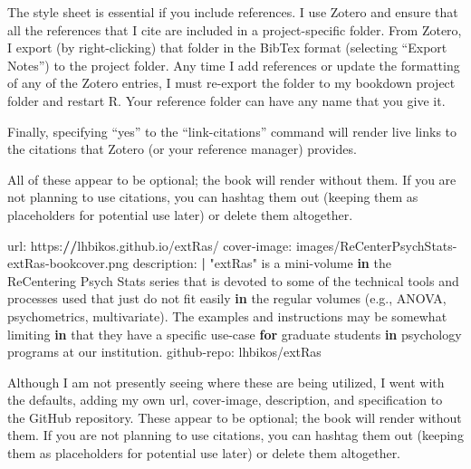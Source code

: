\documentclass[
]{book}
\newenvironment{Shaded}{\begin{snugshade}}{\end{snugshade}}
\newcommand{\ControlFlowTok}[1]{\textcolor[rgb]{0.13,0.29,0.53}{\textbf{#1}}}
\newcommand{\ErrorTok}[1]{\textcolor[rgb]{0.64,0.00,0.00}{\textbf{#1}}}
\newcommand{\FunctionTok}[1]{\textcolor[rgb]{0.00,0.00,0.00}{#1}}
\newcommand{\NormalTok}[1]{#1}
\newcommand{\SpecialCharTok}[1]{\textcolor[rgb]{0.00,0.00,0.00}{#1}}
\newcommand{\StringTok}[1]{\textcolor[rgb]{0.31,0.60,0.02}{#1}}
\begin{document}
The style sheet is essential if you include references. I use Zotero and ensure that all the references that I cite are included in a project-specific folder. From Zotero, I export (by right-clicking) that folder in the BibTex format (selecting ``Export Notes'') to the project folder. Any time I add references or update the formatting of any of the Zotero entries, I must re-export the folder to my bookdown project folder and restart R. Your reference folder can have any name that you give it.

Finally, specifying ``yes'' to the ``link-citations'' command will render live links to the citations that Zotero (or your reference manager) provides.

All of these appear to be optional; the book will render without them. If you are not planning to use citations, you can hashtag them out (keeping them as placeholders for potential use later) or delete them altogether.

\begin{Shaded}
\begin{Highlighting}[]
\NormalTok{url}\SpecialCharTok{:}\NormalTok{ https}\SpecialCharTok{:}\ErrorTok{//}\NormalTok{lhbikos.github.io}\SpecialCharTok{/}\NormalTok{extRas}\SpecialCharTok{/} 
\NormalTok{cover}\SpecialCharTok{{-}}\NormalTok{image}\SpecialCharTok{:}\NormalTok{ images}\SpecialCharTok{/}\NormalTok{ReCenterPsychStats}\SpecialCharTok{{-}}\NormalTok{extRas}\SpecialCharTok{{-}}\NormalTok{bookcover.png }
\NormalTok{description}\SpecialCharTok{:} \ErrorTok{|}
  \StringTok{"extRas"}\NormalTok{ is a mini}\SpecialCharTok{{-}}\NormalTok{volume }\ControlFlowTok{in}\NormalTok{ the ReCentering Psych Stats series that is devoted to some of the technical tools and processes used that just do not fit easily }\ControlFlowTok{in}\NormalTok{ the regular }\FunctionTok{volumes}\NormalTok{ (e.g., ANOVA, psychometrics, multivariate). The examples and instructions may be somewhat limiting }\ControlFlowTok{in}\NormalTok{ that they have a specific use}\SpecialCharTok{{-}}\NormalTok{case }\ControlFlowTok{for}\NormalTok{ graduate students }\ControlFlowTok{in}\NormalTok{ psychology programs at our institution.}
\NormalTok{github}\SpecialCharTok{{-}}\NormalTok{repo}\SpecialCharTok{:}\NormalTok{ lhbikos}\SpecialCharTok{/}\NormalTok{extRas}
\end{Highlighting}
\end{Shaded}

Although I am not presently seeing where these are being utilized, I went with the defaults, adding my own url, cover-image, description, and specification to the GitHub repository. These appear to be optional; the book will render without them. If you are not planning to use citations, you can hashtag them out (keeping them as placeholders for potential use later) or delete them altogether.
\end{document}
